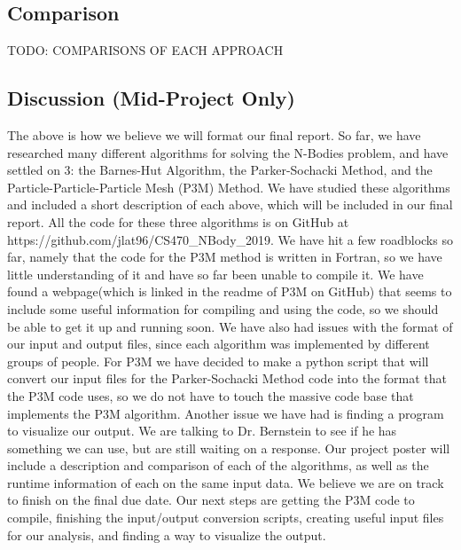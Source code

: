 \documentclass[11pt]{article}
\begin{document}
\begin{center}
\section*{Comparison}
\end{center}
TODO: COMPARISONS OF EACH APPROACH
\begin{center}
\section*{Discussion (Mid-Project Only)}
\end{center}
The above is how we believe we will format our final report. So far, we have researched many different algorithms for solving the N-Bodies problem, and have settled on 3: the Barnes-Hut Algorithm, the Parker-Sochacki Method, and the Particle-Particle-Particle Mesh (P3M) Method. We have studied these algorithms and included a short description of each above, which will be included in our final report. All the code for these three algorithms is on GitHub at \newline https://github.com/jlat96/CS470\_NBody\_2019.
\newline \newline
We have hit a few roadblocks so far, namely that the code for the P3M method is written in Fortran, so we have little understanding of it and have so far been unable to compile it. We have found a webpage(which is linked in the readme of P3M on GitHub) that seems to include some useful information for compiling and using the code, so we should be able to get it up and running soon. We have also had issues with the format of our input and output files, since each algorithm was implemented by different groups of people. For P3M we have decided to make a python script that will convert our input files for the Parker-Sochacki Method code into the format that the P3M code uses, so we do not have to touch the massive code base that implements the P3M algorithm. Another issue we have had is finding a program to visualize our output. We are talking to Dr. Bernstein to see if he has something we can use, but are still waiting on a response.
\newline \newline
Our project poster will include a description and comparison of each of the algorithms, as well as the runtime information of each on the same input data.
\newline \newline
We believe we are on track to finish on the final due date. Our next steps are getting the P3M code to compile, finishing the input/output conversion scripts, creating useful input files for our analysis, and finding a way to visualize the output.
\end{document}
